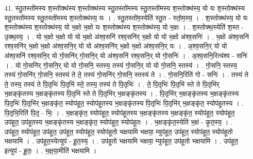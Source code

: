 \documentclass[17pt]{extarticle}
\begin{document}
41. स्तु॒तस्तो॑मस्य श॒स्तोक्थ॑स्य श॒स्तोक्थ॑स्य स्तु॒तस्तो॑मस्य स्तु॒तस्तो॑मस्य श॒स्तोक्थ॑स्य॒ यो यः श॒स्तोक्थ॑स्य स्तु॒तस्तो॑मस्य स्तु॒तस्तो॑मस्य श॒स्तोक्थ॑स्य॒ यः । . स्तु॒तस्तो॑म॒स्येति॑ स्तु॒त - स्तो॒म॒स्य॒ । . श॒स्तोक्थ॑स्य॒ यो यः श॒स्तोक्थ॑स्य श॒स्तोक्थ॑स्य॒ यो भ॒क्षो भ॒क्षो यः श॒स्तोक्थ॑स्य श॒स्तोक्थ॑स्य॒ यो भ॒क्षः । . श॒स्तोक्थ॒स्येति॑ श॒स्त - उ॒क्थ॒स्य॒ । . यो भ॒क्षो भ॒क्षो यो यो भ॒क्षो अ॑श्व॒सनि॑ रश्व॒सनि॑र् भ॒क्षो यो यो भ॒क्षो अ॑श्व॒सनिः॑ । . भ॒क्षो अ॑श्व॒सनि॑ रश्व॒सनि॑र् भ॒क्षो भ॒क्षो अ॑श्व॒सनि॒र् यो यो अ॑श्व॒सनि॑र् भ॒क्षो भ॒क्षो अ॑श्व॒सनि॒र् यः । . अ॒श्व॒सनि॒र् यो यो अ॑श्व॒सनि॑ रश्व॒सनि॒र् यो गो॒सनि॑र् गो॒सनि॒र् यो अ॑श्व॒सनि॑ रश्व॒सनि॒र् यो गो॒सनिः॑ । . अ॒श्व॒सनि॒रित्य॑श्व - सनिः॑ । . यो गो॒सनि॑र् गो॒सनि॒र् यो यो गो॒सनि॒ स्तस्य॒ तस्य॑ गो॒सनि॒र् यो यो गो॒सनि॒ स्तस्य॑ । . गो॒सनि॒ स्तस्य॒ तस्य॑ गो॒सनि॑र् गो॒सनि॒ स्तस्य॑ ते ते॒ तस्य॑ गो॒सनि॑र् गो॒सनि॒ स्तस्य॑ ते । . गो॒सनि॒रिति॑ गो - सनिः॑ । . तस्य॑ ते ते॒ तस्य॒ तस्य॑ ते पि॒तृभिः॑ पि॒तृभि॑ स्ते॒ तस्य॒ तस्य॑ ते पि॒तृभिः॑ । . ते॒ पि॒तृभिः॑ पि॒तृभि॑ स्ते ते पि॒तृभि॑र् भ॒क्षङ्‍कृ॑तस्य भ॒क्षङ्‍कृ॑तस्य पि॒तृभि॑ स्ते ते पि॒तृभि॑र् भ॒क्षङ्‍कृ॑तस्य । . पि॒तृभि॑र् भ॒क्षङ्‍कृ॑तस्य भ॒क्षङ्‍कृ॑तस्य पि॒तृभिः॑ पि॒तृभि॑र् भ॒क्षङ्‍कृ॑त॒ स्योप॑हूत॒ स्योप॑हूतस्य भ॒क्षङ्‍कृ॑तस्य पि॒तृभिः॑ पि॒तृभि॑र् भ॒क्षङ्‍कृ॑त॒ स्योप॑हूतस्य । . पि॒तृभि॒रिति॑ पि॒तृ - भिः॒ । . भ॒क्षङ्‍कृ॑त॒ स्योप॑हूत॒ स्योप॑हूतस्य भ॒क्षङ्‍कृ॑तस्य भ॒क्षङ्‍कृ॑त॒ स्योप॑हूत॒ स्योप॑हूत॒ उप॑हूत॒ उप॑हूतस्य भ॒क्षङ्‍कृ॑तस्य भ॒क्षङ्‍कृ॑त॒ स्योप॑हूत॒ स्योप॑हूतः । . भ॒क्षङ्‍कृ॑त॒स्येति॑ भ॒क्षं - कृ॒त॒स्य॒ । . उप॑हूत॒ स्योप॑हूत॒ उप॑हूत॒ उप॑हूत॒ स्योप॑हूत॒ स्योप॑हूतो भक्षयामि भक्षया॒ म्युप॑हूत॒ उप॑हूत॒ स्योप॑हूत॒ स्योप॑हूतो भक्षयामि । . उप॑हूत॒स्येत्युप॑ - हू॒त॒स्य॒ । . उप॑हूतो भक्षयामि भक्षया॒ म्युप॑हूत॒ उप॑हूतो भक्षयामि । . उप॑हूत॒ इत्युप॑ - हू॒तः॒ । . भ॒क्ष॒या॒मीति॑ भक्षयामि । \newline
\pagebreak
{}
\end{document}
